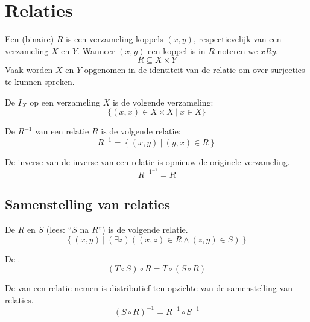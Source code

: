 \documentclass[main.tex]{subfiles}
\begin{document}
\chapter{Relaties}
\label{cha:relaties}

\begin{de}
  Een (binaire)  $R$ is een verzameling koppels $(x,y)$, respectievelijk van een verzameling $X$ en $Y$. 
  Wanneer $(x,y)$ een koppel is in $R$ noteren we $x R y$.
  \[ R \subseteq X \times Y \]
  Vaak worden $X$ en $Y$ opgenomen in de identiteit van de relatie om over surjecties te kunnen spreken.
\end{de}

\begin{de}
  De  $I_{X}$ op een verzameling $X$ is de volgende verzameling:
  \[ \{(x,x) \in X \times X\ |\ x \in X \} \]
\end{de}

\begin{de}
  De  $R^{-1}$ van een relatie $R$ is de volgende relatie:
  \[ R^{-1} = \left\{ (x,y)\ |\ (y,x) \in R \right\} \]
\end{de}

\begin{st}
  De inverse van de inverse van een relatie is opnieuw de originele verzameling.
  \[ R^{-1^{-1}} = R \]
\end{st}

\section{Samenstelling van relaties}
\label{sec:samenst-van-relat}

\begin{de}
  De  $R$ en $S$ (lees: ``$S$ na $R$'') is de volgende relatie.
  \[ \left\{ (x,y) \ |\ (\exists z) ((x,z) \in R \wedge (z,y) \in S) \right\} \]
\end{de}

\begin{st}
  \label{st:samenstelling-relaties-associatief}
  De .
  \[ (T \circ S) \circ R = T \circ (S \circ R) \]
\end{st}

\begin{st}
  De  van een relatie nemen is distributief ten opzichte van de samenstelling van relaties.
  \[ (S \circ R)^{-1} = R^{-1} \circ S^{-1} \]
\end{st}
\end{document}
